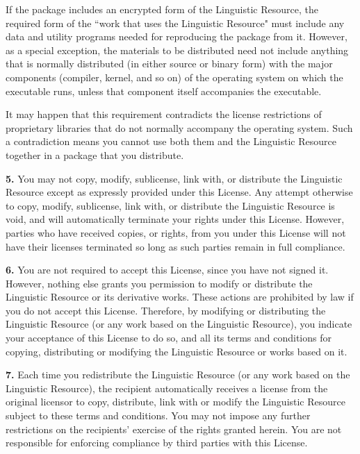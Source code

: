 \documentclass[10pt]{article}
\begin{document}
\vspace{5pt}\noindent
If the 
      package includes an encrypted form of the Linguistic Resource, the 
      required form of the ``work that uses the Linguistic Resource" must include 
      any data and utility programs needed for reproducing the package from it. 
      However, as a special exception, the materials to be distributed need not 
      include anything that is normally distributed (in either source or binary 
      form) with the major components (compiler, kernel, and so on) of the 
      operating system on which the executable runs, unless that component 
      itself accompanies the executable. 

\vspace{5pt}\noindent
It may 
      happen that this requirement contradicts the license restrictions of 
      proprietary libraries that do not normally accompany the operating system. 
      Such a contradiction means you cannot use both them and the Linguistic 
      Resource together in a package that you distribute. 

\vspace{5pt}\noindent
{\bf 5.} You may not copy, modify, 
      sublicense, link with, or distribute the Linguistic Resource except as 
      expressly provided under this License. Any attempt otherwise to copy, 
      modify, sublicense, link with, or distribute the Linguistic Resource is 
      void, and will automatically terminate your rights under this License. 
      However, parties who have received copies, or rights, from you under this 
      License will not have their licenses terminated so long as such parties 
      remain in full compliance. 

\vspace{5pt}\noindent
{\bf 6.} You are not required to 
      accept this License, since you have not signed it. However, nothing else 
      grants you permission to modify or distribute the Linguistic Resource or 
      its derivative works. These actions are prohibited by law if you do not 
      accept this License. Therefore, by modifying or distributing the 
      Linguistic Resource (or any work based on the Linguistic Resource), you 
      indicate your acceptance of this License to do so, and all its terms and 
      conditions for copying, distributing or modifying the Linguistic Resource 
      or works based on it. 

\vspace{5pt}\noindent
{\bf 7.} Each time you redistribute 
      the Linguistic Resource (or any work based on the Linguistic Resource), 
      the recipient automatically receives a license from the original licensor 
      to copy, distribute, link with or modify the Linguistic Resource subject 
      to these terms and conditions. You may not impose any further restrictions 
      on the recipients' exercise of the rights granted herein. You are not 
      responsible for enforcing compliance by third parties with this License. 
\end{document}
